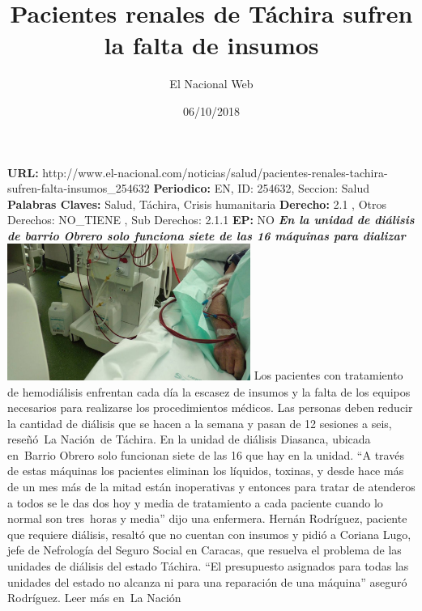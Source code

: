 \documentclass{article}%
\title{\textbf{Pacientes renales de Táchira sufren la falta de insumos}}%
\author{El Nacional Web}%
\date{06/10/2018}%
\begin{document}
%
\normalsize%
\maketitle%
\textbf{URL: }%
http://www.el{-}nacional.com/noticias/salud/pacientes{-}renales{-}tachira{-}sufren{-}falta{-}insumos\_254632\newline%
%
\textbf{Periodico: }%
EN, %
ID: %
254632, %
Seccion: %
Salud\newline%
%
\textbf{Palabras Claves: }%
Salud, Táchira, Crisis humanitaria\newline%
%
\textbf{Derecho: }%
2.1%
, Otros Derechos: %
NO\_TIENE%
, Sub Derechos: %
2.1.1%
\newline%
%
\textbf{EP: }%
NO\newline%
\newline%
%
\textbf{\textit{En la unidad de diálisis de barrio Obrero solo funciona siete de las 16 máquinas para dializar~}}%
\newline%
\newline%
%
\includegraphics[width=300px]{230.jpg}%
\newline%
%
Los pacientes con tratamiento de hemodiálisis enfrentan cada día la escasez de insumos y la falta de los equipos necesarios para realizarse los procedimientos médicos.%
\newline%
%
Las personas deben reducir la cantidad de diálisis que se hacen a la semana y pasan de 12 sesiones a seis, reseñó~La Nación~de Táchira.%
\newline%
%
En la unidad de diálisis Diasanca, ubicada en~Barrio Obrero solo funcionan siete de las 16 que hay en la unidad.%
\newline%
%
“A través de estas máquinas los pacientes eliminan los líquidos, toxinas, y desde hace más de un mes más de la mitad están inoperativas y entonces para tratar de atenderos a todos se le das dos hoy y media de tratamiento a cada paciente cuando lo normal son tres~horas y media” dijo una enfermera.%
\newline%
%
Hernán Rodríguez, paciente que requiere diálisis, resaltó que no cuentan con insumos y pidió a Coriana Lugo, jefe de Nefrología del Seguro Social en Caracas, que resuelva el problema de las unidades de diálisis del estado Táchira. “El presupuesto asignados para todas las unidades del estado no alcanza ni para una reparación de una máquina” aseguró Rodríguez.%
\newline%
%
Leer más en~La Nación%
\newline%
%
\end{document}
